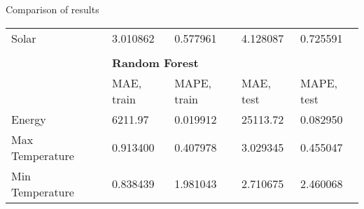 \documentclass[xcolor=table]{beamer}
\begin{document}
\begin{frame}{Comparison of results}
{\begin{table}[]
\begin{tabular}{llllll}
\multicolumn{1}{|l|}{\cellcolor[HTML]{ECF4FF}Solar}             & \multicolumn{1}{l|}{} & \multicolumn{1}{l|}{3.010862}                           & \multicolumn{1}{l|}{0.577961}                            & \multicolumn{1}{l|}{4.128087}                          & \multicolumn{1}{l|}{0.725591}                           \\ \cline{1-1} \cline{3-6} 
                                                                &                       &                                                         &                                                          &                                                        &                                                         \\
                                                                &                       & \multicolumn{4}{l}{\textbf{Random Forest}}                                                                                                                                                                                            \\ \cline{3-6} 
                                                                & \multicolumn{1}{l|}{} & \multicolumn{1}{l|}{\cellcolor[HTML]{ECF4FF}MAE, train} & \multicolumn{1}{l|}{\cellcolor[HTML]{ECF4FF}MAPE, train} & \multicolumn{1}{l|}{\cellcolor[HTML]{ECF4FF}MAE, test} & \multicolumn{1}{l|}{\cellcolor[HTML]{ECF4FF}MAPE, test} \\ \cline{1-1} \cline{3-6} 
\multicolumn{1}{|l|}{\cellcolor[HTML]{ECF4FF}Energy}            & \multicolumn{1}{l|}{} & \multicolumn{1}{l|}{6211.97}                            & \multicolumn{1}{l|}{0.019912}                            & \multicolumn{1}{l|}{25113.72}                          & \multicolumn{1}{l|}{0.082950}                           \\ \cline{1-1}
\multicolumn{1}{|l|}{\cellcolor[HTML]{ECF4FF}Max Temperature}   & \multicolumn{1}{l|}{} & \multicolumn{1}{l|}{0.913400}                           & \multicolumn{1}{l|}{0.407978}                            & \multicolumn{1}{l|}{3.029345}                          & \multicolumn{1}{l|}{0.455047}                           \\ \cline{1-1}
\multicolumn{1}{|l|}{\cellcolor[HTML]{ECF4FF}Min Temperature}   & \multicolumn{1}{l|}{} & \multicolumn{1}{l|}{0.838439}                           & \multicolumn{1}{l|}{1.981043}                            & \multicolumn{1}{l|}{2.710675}                          & \multicolumn{1}{l|}{2.460068}                           \\ \cline{1-1}

\end{tabular}
\end{table}}
\end{frame}
\end{document}
